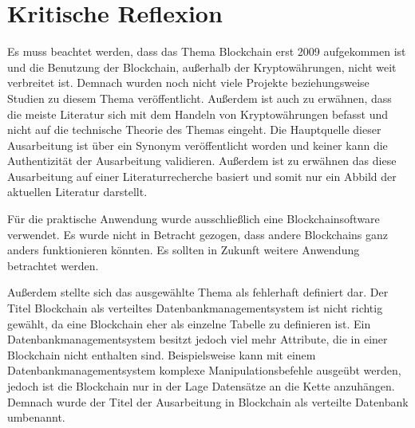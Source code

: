 \section{Kritische Reflexion}
\label{sec:Kritik}
Es muss beachtet werden, dass das Thema Blockchain erst 2009 aufgekommen ist und die Benutzung der Blockchain, außerhalb der Kryptowährungen, nicht weit verbreitet ist. Demnach wurden noch nicht viele Projekte beziehungsweise Studien zu diesem Thema veröffentlicht. Außerdem ist auch zu erwähnen, dass die meiste Literatur sich mit dem Handeln von Kryptowährungen befasst und nicht auf die technische Theorie des Themas eingeht. Die Hauptquelle dieser Ausarbeitung ist über ein Synonym veröffentlicht worden und keiner kann die Authentizität der Ausarbeitung validieren. Außerdem ist zu erwähnen das diese Ausarbeitung auf einer Literaturrecherche basiert und somit nur ein Abbild der aktuellen Literatur darstellt.

Für die praktische Anwendung wurde ausschließlich eine Blockchainsoftware verwendet. Es wurde nicht in Betracht gezogen, dass andere Blockchains ganz anders funktionieren könnten. Es sollten in Zukunft weitere Anwendung betrachtet werden.

Außerdem stellte sich das ausgewählte Thema als fehlerhaft definiert dar. Der Titel \glqq{}Blockchain als verteiltes Datenbankmanagementsystem\grqq{} ist nicht richtig gewählt, da eine Blockchain eher als einzelne Tabelle zu definieren ist. Ein Datenbankmanagementsystem besitzt jedoch viel mehr Attribute, die in einer Blockchain nicht enthalten sind. Beispielsweise kann mit einem Datenbankmanagementsystem komplexe Manipulationsbefehle ausgeübt werden, jedoch ist die Blockchain nur in der Lage Datensätze an die Kette anzuhängen. Demnach wurde der Titel der Ausarbeitung in \glqq{}Blockchain als verteilte Datenbank\grqq{} umbenannt.